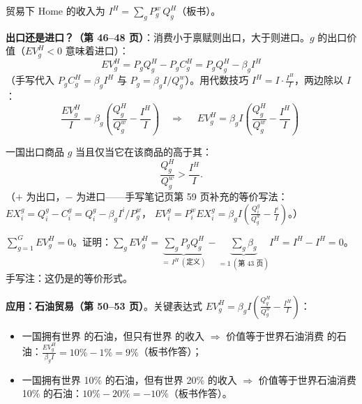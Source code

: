 贸易下 Home 的收入为 $I^H = \sum_g P_g^w\, Q_g^H$（板书）。

\textbf{出口还是进口？（第 46--48 页）}：消费小于禀赋则出口，大于则进口。$g$ 的出口价值（$EV_g^H < 0$ 意味着进口）：
\[
EV_g^H = P_g Q_g^H - P_g C_g^H = P_g Q_g^H - \beta_g I^H
\]
（手写代入 $P_g C_g^H = \beta_g I^H$ 与 $P_g = \beta_g I / Q_g^w$）。用代数技巧 $I^H = I \cdot \frac{I^H}{I}$，两边除以 $I$：
\[
\frac{EV_g^H}{I} = \beta_g \left( \frac{Q_g^H}{Q_g^w} - \frac{I^H}{I} \right)
\quad\Longrightarrow\quad
\boxed{\;EV_g^H = \beta_g I \left( \frac{Q_g^H}{Q_g^w} - \frac{I^H}{I} \right)\;}
\]

\begin{thmbox}
一国出口商品 $g$ 当且仅当它在该商品的高于其：
\[
\frac{Q_g^H}{Q_g^w} > \frac{I^H}{I}.
\]
（$+$ 为出口，$-$ 为进口——手写笔记页第 59 页补充的等价写法：
$EX_i^g = Q_i^g - C_i^g = Q_i^g - \beta_g I^i / P_g^w$，
$EV_i^g = P_i^w EX_i^g = \beta_g I \left( \frac{Q_i^g}{Q_g^w} - \frac{I^i}{I} \right)$。）
\end{thmbox}

\begin{intubox}
$\displaystyle \sum_{g=1}^G EV_g^H = 0$。证明：$\sum_g EV_g^H = \underbrace{\sum_g P_g Q_g^H}_{=\,I^H\ (\text{定义})} - \underbrace{\sum_g \beta_g}_{=1\ (\text{第 43 页})} I^H = I^H - I^H = 0$。
手写注：这仍是的等价形式。
\end{intubox}

\textbf{应用：石油贸易（第 50--53 页）}。关键表达式 $EV_g^H = \beta_g I \left( \frac{Q_g^H}{Q_g^w} - \frac{I^H}{I} \right)$：
\begin{itemize}
  \item 一国拥有世界  的石油，但只有世界  的收入 $\Rightarrow$ 价值等于世界石油消费  的石油：$\frac{EV_g^H}{\beta_g I} = 10\% - 1\% = 9\%$（板书作答）；
  \item 一国拥有世界 10\% 的石油，但有世界 20\% 的收入 $\Rightarrow$ 价值等于世界石油消费 10\% 的石油：$10\% - 20\% = -10\%$（板书作答）。
\end{itemize}

